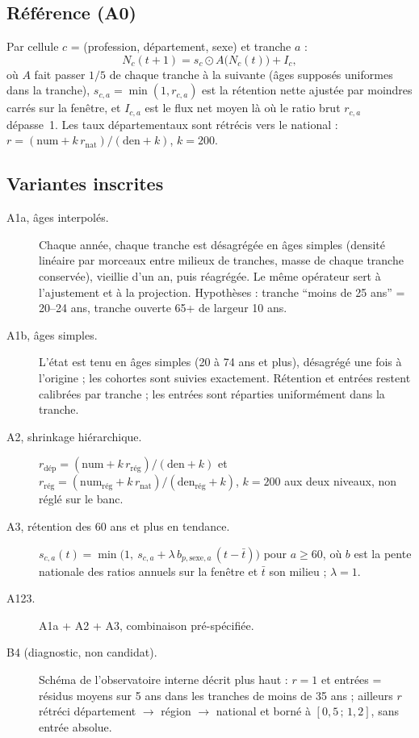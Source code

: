 \subsection{Référence (A0)}
Par cellule $c$ = (profession, département, sexe) et tranche $a$ :
\begin{equation}
  N_{c}(t+1) = s_{c} \odot A\big(N_{c}(t)\big) + I_{c},
\end{equation}
où $A$ fait passer $1/5$ de chaque tranche à la suivante (âges supposés uniformes dans la tranche),
$s_{c,a} = \min(1, r_{c,a})$ est la rétention nette ajustée par moindres carrés sur la fenêtre, et
$I_{c,a}$ est le flux net moyen là où le ratio brut $r_{c,a}$ dépasse~1. Les taux départementaux sont
rétrécis vers le national : $r = (\text{num} + k\,r_{\text{nat}})/(\text{den} + k)$, $k = 200$\suppose.

\subsection{Variantes inscrites}
\begin{description}
  \item[A1a, âges interpolés.] Chaque année, chaque tranche est désagrégée en âges simples (densité
        linéaire par morceaux entre milieux de tranches, masse de chaque tranche conservée), vieillie
        d'un an, puis réagrégée. Le même opérateur sert à l'ajustement et à la projection. Hypothèses :
        tranche \enquote{moins de 25 ans} = 20--24 ans\suppose, tranche ouverte 65+ de largeur
        10 ans\suppose.
  \item[A1b, âges simples.] L'état est tenu en âges simples (20 à 74 ans et plus), désagrégé une fois à
        l'origine ; les cohortes sont suivies exactement. Rétention et entrées restent calibrées par
        tranche ; les entrées sont réparties uniformément dans la tranche\suppose.
  \item[A2, shrinkage hiérarchique.] $r_{\text{dép}} = (\text{num} + k\,r_{\text{rég}})/(\text{den} + k)$
        et $r_{\text{rég}} = (\text{num}_{\text{rég}} + k\,r_{\text{nat}})/(\text{den}_{\text{rég}} + k)$,
        $k = 200$\suppose{} aux deux niveaux, non réglé sur le banc.
  \item[A3, rétention des 60 ans et plus en tendance.]
        $s_{c,a}(t) = \min\!\big(1,\ s_{c,a} + \lambda\, b_{p,\text{sexe},a}\,(t - \bar t)\big)$ pour
        $a \ge 60$, où $b$ est la pente nationale des ratios annuels sur la fenêtre et $\bar t$ son
        milieu ; $\lambda = 1$.
  \item[A123.] A1a + A2 + A3, combinaison pré-spécifiée.
  \item[B4 (diagnostic, non candidat).] Schéma de l'observatoire interne décrit plus haut : $r = 1$
        et entrées = résidus moyens sur 5 ans dans les tranches de moins de 35 ans ; ailleurs $r$
        rétréci département $\to$ région $\to$ national et borné à $[0{,}5\,;\,1{,}2]$, sans entrée
        absolue.
\end{description}


